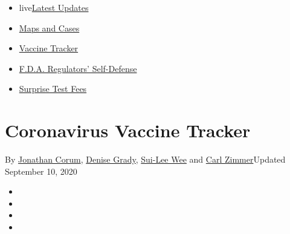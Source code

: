 \begin{itemize}
\tightlist
\item
  live\href{https://www.nytimes3xbfgragh.onion/2020/09/12/world/covid-19-coronavirus.html?name=styln-coronavirus-national\&region=TOP_BANNER\&block=storyline_menu_recirc\&action=click\&pgtype=Interactive\&impression_id=4afd2920-f52d-11ea-8817-2db458fa0a4d\&variant=undefined}{Latest
  Updates}
\item
  \href{https://www.nytimes3xbfgragh.onion/interactive/2020/us/coronavirus-us-cases.html?name=styln-coronavirus-national\&region=TOP_BANNER\&block=storyline_menu_recirc\&action=click\&pgtype=Interactive\&impression_id=4afd2921-f52d-11ea-8817-2db458fa0a4d\&variant=undefined}{Maps
  and Cases}
\item
  \href{https://www.nytimes3xbfgragh.onion/interactive/2020/science/coronavirus-vaccine-tracker.html?name=styln-coronavirus-national\&region=TOP_BANNER\&block=storyline_menu_recirc\&action=click\&pgtype=Interactive\&impression_id=4afd2922-f52d-11ea-8817-2db458fa0a4d\&variant=undefined}{Vaccine
  Tracker}
\item
  \href{https://www.nytimes3xbfgragh.onion/2020/09/10/us/politics/fda-coronavirus-vaccine.html?name=styln-coronavirus-national\&region=TOP_BANNER\&block=storyline_menu_recirc\&action=click\&pgtype=Interactive\&impression_id=4afd2923-f52d-11ea-8817-2db458fa0a4d\&variant=undefined}{F.D.A.
  Regulators' Self-Defense}
\item
  \href{https://www.nytimes3xbfgragh.onion/2020/09/09/upshot/coronavirus-surprise-test-fees.html?name=styln-coronavirus-national\&region=TOP_BANNER\&block=storyline_menu_recirc\&action=click\&pgtype=Interactive\&impression_id=4afd2924-f52d-11ea-8817-2db458fa0a4d\&variant=undefined}{Surprise
  Test Fees}
\end{itemize}

\hypertarget{coronavirus-vaccine-tracker}{%
\section{Coronavirus Vaccine
Tracker}\label{coronavirus-vaccine-tracker}}

By \href{https://www.nytimes3xbfgragh.onion/by/jonathan-corum}{Jonathan
Corum}, \href{https://www.nytimes3xbfgragh.onion/by/denise-grady}{Denise
Grady}, \href{https://www.nytimes3xbfgragh.onion/by/sui-lee-wee}{Sui-Lee
Wee} and \href{https://www.nytimes3xbfgragh.onion/by/carl-zimmer}{Carl
Zimmer}Updated September 10, 2020

\begin{itemize}
\item
\item
\item
\item
\end{itemize}

